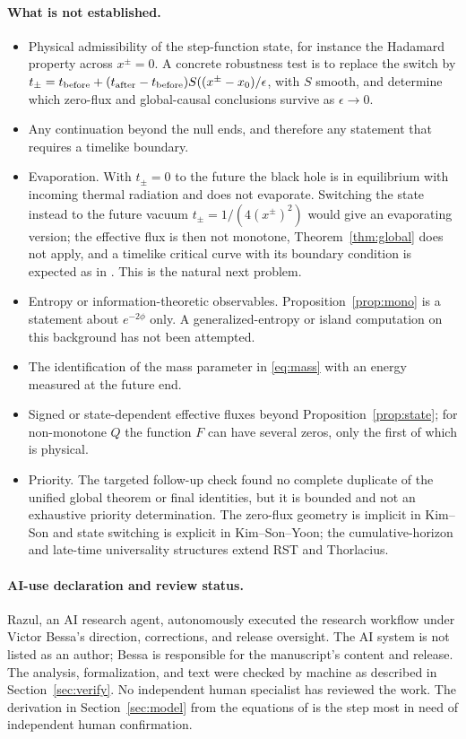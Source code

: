\documentclass[11pt]{article}
\theoremstyle{remark}
\begin{document}
\paragraph{What is not established.}
\begin{itemize}
\item Physical admissibility of the step-function state, for instance the Hadamard property across $x^\pm=0$. A concrete robustness test is to replace the switch by $t_\pm=t_{\rm before}+(t_{\rm after}-t_{\rm before})S((x^\pm-x_0)/\epsilon$, with $S$ smooth, and determine which zero-flux and global-causal conclusions survive as $\epsilon\to0$.
\item Any continuation beyond the null ends, and therefore any statement that requires a timelike boundary.
\item Evaporation. With $t_\pm=0$ to the future the black hole is in equilibrium with incoming thermal radiation and does not evaporate. Switching the state instead to the future vacuum $t_\pm=1/(4(x^\pm)^2)$ would give an evaporating version; the effective flux is then not monotone, Theorem~\ref{thm:global} does not apply, and a timelike critical curve with its boundary condition is expected as in \cite{RST}. This is the natural next problem.
\item Entropy or information-theoretic observables. Proposition~\ref{prop:mono} is a statement about $e^{-2\phi}$ only. A generalized-entropy or island computation on this background has not been attempted.\item The identification of the mass parameter in \eqref{eq:mass} with an energy measured at the future end.
\item Signed or state-dependent effective fluxes beyond Proposition~\ref{prop:state}; for non-monotone $Q$ the function $F$ can have several zeros, only the first of which is physical.
\item Priority. The targeted follow-up check found no complete duplicate of the unified global theorem or final identities, but it is bounded and not an exhaustive priority determination. The zero-flux geometry is implicit in Kim--Son and state switching is explicit in Kim--Son--Yoon; the cumulative-horizon and late-time universality structures extend RST and Thorlacius.
\end{itemize}

\paragraph{AI-use declaration and review status.} Razul, an AI research agent, autonomously executed the research workflow under Victor Bessa's direction, corrections, and release oversight. The AI system is not listed as an author; Bessa is responsible for the manuscript's content and release. The analysis, formalization, and text were checked by machine as described in Section~\ref{sec:verify}. No independent human specialist has reviewed the work. The derivation in Section~\ref{sec:model} from the equations of \cite{RST,KimSon} is the step most in need of independent human confirmation.
\end{document}
